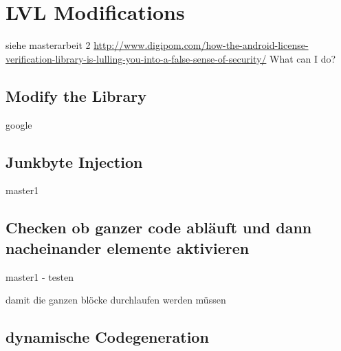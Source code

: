 \section{LVL Modifications}\label{section:lvlModifications}
siehe masterarbeit 2
\url{http://www.digipom.com/how-the-android-license-verification-library-is-lulling-you-into-a-false-sense-of-security/} What can I do?
\newline
\subsection{Modify the Library}\label{subsection:basic-}
google

\subsection{Junkbyte Injection}\label{subsection:basic-junkbyte}
master1


\subsection{Checken ob ganzer code abläuft und dann nacheinander elemente aktivieren}\label{subsection:basic-flow}
master1 - testen\newline

damit die ganzen blöcke durchlaufen werden müssen


\subsection{dynamische Codegeneration}\label{subsection:advanced-secure}
